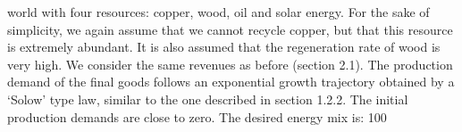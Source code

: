 \documentclass[12pt,a4paper]{article}%
\begin{document}
\begin{appendix}
world with four resources: copper, wood, oil and solar energy. For the sake of simplicity, we again assume that we cannot recycle copper, but that this resource is extremely abundant. It is also assumed that the regeneration rate of wood is very high.  We consider the same revenues as before (section 2.1). The production demand of the final goods follows an exponential growth trajectory obtained by a `Solow' type law, similar to the one described in section 1.2.2. The initial production demands are close to zero.  The desired energy mix is: 100 %

\end{appendix}
\end{document}
